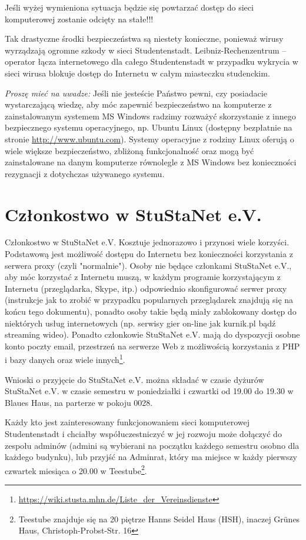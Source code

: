 \documentclass[a4paper,12pt]{scrartcl}
\begin{document}
\begin{em}
Jeśli wyżej wymieniona sytuacja będzie się powtarzać dostęp do sieci komputerowej zostanie odcięty na stałe!!!
\end{em}

Tak drastyczne środki bezpieczeństwa są niestety konieczne, ponieważ wirusy wyrządzają ogromne szkody w sieci Studentenstadt. Leibniz-Rechenzentrum – operator łącza internetowego dla całego Studentenstadt w przypadku wykrycia w sieci wirusa blokuje dostęp do Internetu w całym miasteczku studenckim. 

\emph{Proszę mieć na uwadze:} Jeśli nie jesteście Państwo pewni, czy posiadacie wystarczającą wiedzę, aby móc zapewnić bezpieczeństwo na komputerze z zainstalowanym systemem MS Windows radzimy rozważyć skorzystanie z innego bezpiecznego systemu operacyjnego, np. Ubuntu Linux (dostępny bezpłatnie na stronie \url{http://www.ubuntu.com}). Systemy operacyjne z rodziny Linux oferują o wiele większe bezpieczeństwo, zbliżoną funkcjonalność oraz mogą być zainstalowane na danym komputerze równolegle z MS Windows bez konieczności rezygnacji z dotychczas używanego systemu.

\section*{Członkostwo w StuStaNet e.V.}

Członkostwo w StuStaNet e.V. Kosztuje jednorazowo  i przynosi wiele korzyści. Podstawową jest możliwość dostępu do Internetu bez konieczności korzystania z serwera proxy (czyli "normalnie").  Osoby nie będące członkami StuStaNet e.V., aby móc korzystać z Internetu muszą, w każdym programie korzystającym z Internetu (przeglądarka, Skype, itp.) odpowiednio skonfigurować serwer proxy (instrukcje jak to zrobić w przypadku popularnych przeglądarek znajdują się na końcu tego dokumentu), ponadto osoby takie będą miały zablokowany dostęp do niektórych usług internetowych (np. serwisy gier on-line jak kurnik.pl bądź streaming wideo). Ponadto członkowie StuStaNet e.V. mają do dyspozycji osobne konto poczty email, przestrzeń na serwerze Web z możliwością korzystania z PHP i bazy danych oraz wiele innych\footnote{\url{https://wiki.stusta.mhn.de/Liste\_der\_Vereinsdienste}}.

Wnioski o przyjęcie do StuStaNet e.V. można składać w czasie dyżurów StuStaNet e.V. w czasie semestru w poniedziałki i czwartki od 19.00 do 19.30 w Blaues Haus, na parterze w pokoju 0028.

Każdy kto jest zainteresowany funkcjonowaniem sieci komputerowej Studentenstadt i chciałby współuczestniczyć w jej rozwoju może dołączyć do zespołu adminów (admini są wybierani na początku każdego semestru osobno dla każdego budynku), lub przyjść na Adminrat, który ma miejsce w każdy pierwszy czwartek miesiąca o 20.00 w Teestube\footnote{Teestube znajduje się na 20 piętrze Hanns Seidel Haus (HSH), inaczej Grünes Haus, Christoph-Probst-Str. 16}.
\end{document}
